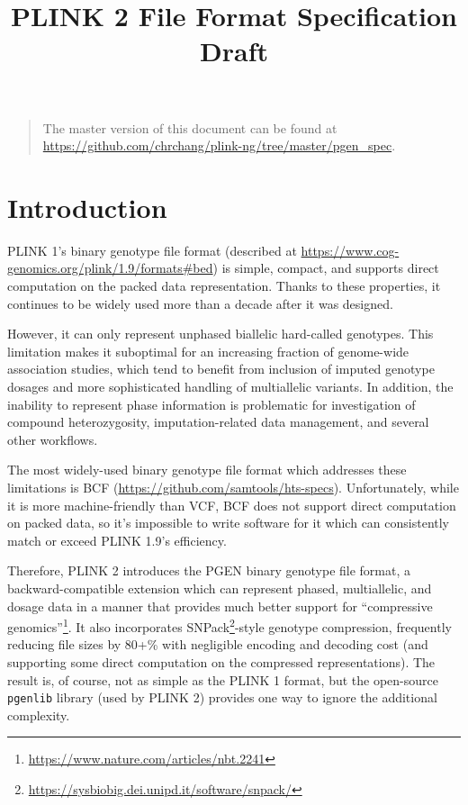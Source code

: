 \documentclass[8pt]{article}
\begin{document}
\title{PLINK 2 File Format Specification Draft}
\maketitle
\begin{quote}\small
  The master version of this document can be found at
  \url{https://github.com/chrchang/plink-ng/tree/master/pgen_spec}. \\
\end{quote}

\newpage
\tableofcontents

\newpage
\section{Introduction}
PLINK 1's binary genotype file format (described at
\url{https://www.cog-genomics.org/plink/1.9/formats#bed}) is simple, compact,
and supports direct computation on the packed data representation.  Thanks to
these properties, it continues to be widely used more than a decade after it
was designed.

However, it can only represent unphased biallelic hard-called genotypes.  This
limitation makes it suboptimal for an increasing fraction of genome-wide
association studies, which tend to benefit from inclusion of imputed genotype
dosages and more sophisticated handling of multiallelic variants.  In addition,
the inability to represent phase information is problematic for investigation
of compound heterozygosity, imputation-related data management, and several
other workflows.

The most widely-used binary genotype file format which addresses these
limitations is BCF (\url{https://github.com/samtools/hts-specs}).
Unfortunately, while it is more machine-friendly than VCF, BCF does not support
direct computation on packed data, so it's impossible to write software for it
which can consistently match or exceed PLINK 1.9's efficiency.

Therefore, PLINK 2 introduces the PGEN binary genotype file format, a
backward-compatible extension which can represent phased, multiallelic, and
dosage data in a manner that provides much better support for ``compressive
genomics''\footnote{\url{https://www.nature.com/articles/nbt.2241}}.  It also
incorporates
SNPack\footnote{\url{https://sysbiobig.dei.unipd.it/software/snpack/}}-style
genotype compression, frequently reducing file sizes by 80+\% with negligible
encoding and decoding cost (and supporting some direct computation on the
compressed representations).  The result is, of course, not as simple as the
PLINK 1 format, but the open-source \texttt{pgenlib} library (used by PLINK 2)
provides one way to ignore the additional complexity.
\end{document}
